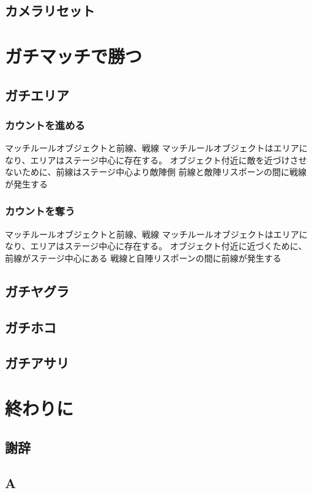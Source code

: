 \documentclass[a4paper,11pt]{jsbook}
\begin{document}
\chapter{カメラリセット}

\part{ガチマッチで勝つ}
\chapter{ガチエリア}
\section{カウントを進める}
マッチルールオブジェクトと前線、戦線
マッチルールオブジェクトはエリアになり、エリアはステージ中心に存在する。
オブジェクト付近に敵を近づけさせないために、前線はステージ中心より敵陣側
前線と敵陣リスポーンの間に戦線が発生する

\section{カウントを奪う}
マッチルールオブジェクトと前線、戦線
マッチルールオブジェクトはエリアになり、エリアはステージ中心に存在する。
オブジェクト付近に近づくために、前線がステージ中心にある
戦線と自陣リスポーンの間に前線が発生する


\chapter{ガチヤグラ}
\chapter{ガチホコ}
\chapter{ガチアサリ}

\part{終わりに}
\chapter{謝辞}

\appendix
\chapter{A}
\end{document}
